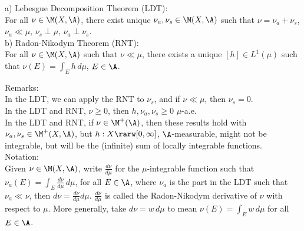 \noindent 
a) Lebesgue Decomposition Theorem (LDT): \\

\noindent 
For all $\nu \in \M(X, \A)$, there exist unique $\nu_a, \nu_s \in \M(X, \A)$ such that $\nu = \nu_a + \nu_s$, $\nu_a \ll \mu$, $\nu_s \perp \mu$, $\nu_a \perp \nu_s$. \\

\noindent 
b) Radon-Nikodym Theorem (RNT): \\

\noindent 
For all $\nu \in \M(X, \A)$ such that $\nu \ll \mu$, there exists a unique $[h] \in L^1(\mu)$ such that $ \nu(E) = \int_E h \, d\mu $, $E \in \A$. \\

\vspace{10pt}

\noindent
Remarks:  \\

\noindent
In the LDT, we can apply the RNT to $\nu_s$, and if $\nu \ll \mu$, then $\nu_s = 0$. \\

\noindent
In the LDT and RNT, $\nu \ge 0$, then $h, \nu_a, \nu_s \ge 0$ $\mu$-a.e. \\

\noindent
In the LDT and RNT, if $\nu \in \M^+(\A)$, then these results hold with $\nu_a, \nu_s \in \M^+(X, \A)$, but  $h: X \rarw [0, \infty]$, $\A$-measurable, might not be integrable, but will be the (infinite) sum of locally integrable functions. \\

\noindent
Notation: \\


\noindent
Given $\nu \in \M(X, \A)$, write $\frac{d\nu}{d\mu}$ for the $\mu$-integrable function such that $\nu_a(E) = \int_E \frac{d\nu}{d\mu} \, d\mu$, for all $E \in \A$, where $\nu_a$ is the part in the LDT such that $\nu_a \ll \nu$, then $d\nu =\frac{d\nu}{d\mu} d\mu$. $\frac{d\nu}{d\mu}$ is called the Radon-Nikodym derivative of $\nu$ with respect to $\mu$. More generally, take $d\nu = w \, d\mu$ to mean $\nu(E) = \int_E w \, d\mu$ for all $E \in \A$. \\







